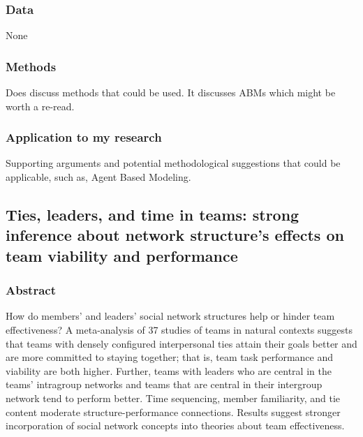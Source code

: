 \documentclass[12pt]{article}
\begin{document}
\subsubsection*{Data}

None

\subsubsection*{Methods}

Does discuss methods that could be used. It discusses ABMs which might be worth a re-read.

\subsubsection*{Application to my research}

Supporting arguments and potential methodological suggestions that could be applicable, such as, Agent Based Modeling.


\subsection*{Ties, leaders, and time in teams: strong inference about network structure's effects on team viability and performance\cite{time_in_teams_strong_inference}}

\subsubsection*{Abstract}

How do members’ and leaders’ social network structures help or hinder team effectiveness? A meta-analysis of 37 studies of teams in natural contexts suggests that teams with densely configured interpersonal ties attain their goals better and are more committed to staying together; that is, team task performance and viability are both higher. Further, teams with leaders who are central in the teams’ intragroup networks and teams that are central in their intergroup network tend to perform better. Time sequencing, member familiarity, and tie content moderate structure-performance connections. Results suggest stronger incorporation of social network concepts into theories about team effectiveness.
\end{document}
